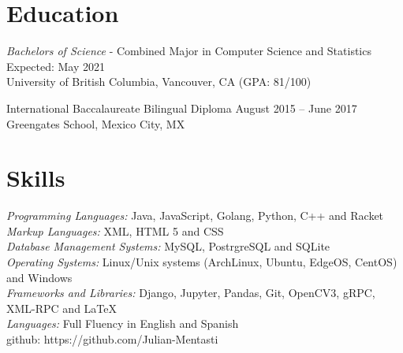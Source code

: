 \documentclass[letter]{res}
\begin{document}
\address{ (778)-882-3453 \\}
\address{
  \texttt{julian@mentasti.net}\\ } 
\begin{resume}
  \noindent\makebox[\linewidth]{\rule{\paperwidth}{0.4pt}}

\section{Education}
{\sl Bachelors of Science} - Combined Major in Computer Science and Statistics \hfill Expected: May 2021\\
University of British Columbia,  Vancouver, CA \hfill (GPA: 81/100)
  \vspace{-4mm}
  
International Baccalaureate Bilingual Diploma \hfill August 2015 – June 2017\\
Greengates School, Mexico City, MX
 \vspace{-2mm}

\section{Skills}
{\sl Programming Languages:}  Java, JavaScript, Golang, Python, C++ and Racket\\
{\sl Markup Languages:} XML, HTML 5 and CSS \\
{\sl Database Management Systems:} MySQL, PostrgreSQL and SQLite \\
{\sl Operating Systems:} Linux/Unix systems (ArchLinux, Ubuntu, EdgeOS, CentOS) and Windows \\ 
{\sl Frameworks and Libraries:} Django, Jupyter, Pandas, Git, OpenCV3, gRPC, XML-RPC and  \LaTeX \\ 
{\sl Languages:} Full Fluency in English and Spanish \\
github: https://github.com/Julian-Mentasti
 \vspace{-4mm}


\end{resume}
\end{document}
